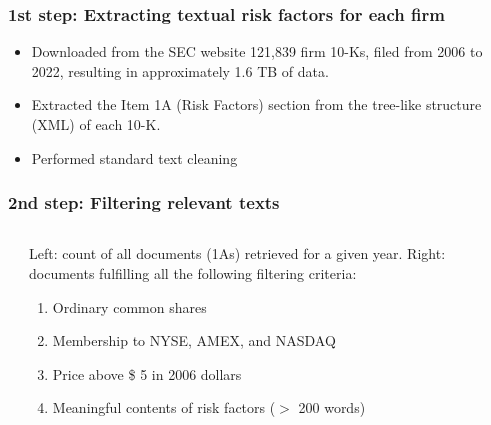 \documentclass{beamer}
\newcommand{\ffo}{dicfullmc10thr10defnob40noa1_4t}
\begin{document}
\begin{frame}
\frametitle{1st step: Extracting textual risk factors for each firm}
\begin{itemize}
\item Downloaded from the SEC website 121,839 firm 10-Ks, filed from 2006 to 2022, resulting in approximately 1.6 TB of data. 
\item Extracted the Item 1A (Risk Factors) section from the tree-like structure (XML) of each 10-K.
\item Performed standard text cleaning
\end{itemize}
\end{frame}

%


\begin{frame}
\frametitle{2nd step: Filtering relevant texts}
\scriptsize
    \begin{columns}[T]
    \begin{column}{0.5\textwidth}

    \end{column}

    \begin{column}{0.5\textwidth}
    \normalsize
    Left: count of all documents (1As) retrieved for a given year. Right: documents fulfilling all the following filtering criteria: 
    \begin{enumerate}
   \item Ordinary common shares
   \item  	Membership to NYSE, AMEX, and NASDAQ
   \item Price above \$ 5 in 2006 dollars
   \item Meaningful contents of risk factors ($>$ 200 words)
   \hyperlink{slide:nonfilingfirms}{}\hyperlink{slide:min_words}{}
    \end{enumerate}
    \end{column}
    \end{columns}
\end{frame}
\end{document}
